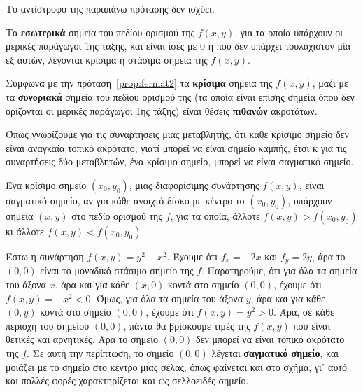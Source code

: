 \begin{rem}
\item {}
  Το αντίστροφο της παραπάνω πρότασης δεν ισχύει. 
\end{rem}

\begin{dfn}
  Τα \textbf{εσωτερικά} σημεία του πεδίου ορισμού της $ f(x,y) $, για τα οποία 
  υπάρχουν οι μερικές παράγωγοι 1ης τάξης, και είναι ίσες με 0 ή που δεν υπάρχει 
  τουλάχιστον μία εξ αυτών, λέγονται \textcolor{Col1}{κρίσιμα} ή
  \textcolor{Col1}{στάσιμα} σημεία της $ f(x,y) $. 
\end{dfn}

\begin{rem}
  Σύμφωνα με την πρόταση~\ref{prop:fermat2} τα \textbf{κρίσιμα} σημεία της $ f(x,y) $, 
  μαζί με τα \textbf{συνοριακά} σημεία του πεδίου ορισμού της (τα οποία είναι επίσης  
  σημεία όπου δεν ορίζονται οι μερικές παράγωγοι 1ης τάξης) είναι θέσεις \textbf{πιθανών} ακροτάτων.
\end{rem}

Όπως γνωρίζουμε για τις συναρτήσεις μιας μεταβλητής, ότι κάθε κρίσιμο σημείο δεν είναι 
αναγκαία τοπικό ακρότατο, γιατί μπορεί να είναι σημείο καμπής, έτσι κ για τις
συναρτήσεις δύο μεταβλητών, ένα κρίσιμο σημείο, μπορεί να είναι σαγματικό σημείο.

\begin{dfn}
  Ένα κρίσιμο σημείο $ (x_{0}, y_{0}) $, μιας διαφορίσιμης συνάρτησης $ f(x,y) $, είναι
  \textcolor{Col1}{σαγματικό σημείο}, αν για κάθε ανοιχτό δίσκο με κέντρο το 
  $ (x_{0}, y_{0}) $, υπάρχουν σημεία $ (x,y) $ στο πεδίο ορισμού της $f$, για τα 
  οποία, άλλοτε $ f(x,y) > f(x_{0}, y_{0}) $ κι άλλοτε $ f(x,y) < f(x_{0}, y_{0}) $. 
\end{dfn}

\begin{example}
\item {}
  Έστω η συνάρτηση $ f(x,y) = y^{2}-x^{2} $. Έχουμε ότι 
  $ f_{x}=-2x $ και $ f_{y}=2y $, άρα το $ (0,0) $ είναι το μοναδικό στάσιμο σημείο 
  της $f$. 
  Παρατηρούμε, ότι για όλα τα σημεία του άξονα $x$, άρα και για κάθε 
  $ (x,0) $ κοντά στο σημείο $(0,0)$, έχουμε ότι $ f(x,y) = -x^{2} < 0 $. 
  Όμως, για όλα τα σημεία του άξονα $ y $, άρα και για κάθε 
  $ (0,y) $ κοντά στο σημείο $ (0,0) $, έχουμε ότι $ f(x,y)=y^{2} > 0 $. 
  Άρα, σε κάθε 
  περιοχή του σημείου $ (0,0) $, πάντα θα βρίσκουμε τιμές της $ f(x,y) $ που είναι
  θετικές και αρνητικές. Άρα το σημείο $ (0,0) $ δεν μπορεί να είναι τοπικό ακρότατο 
  της $f$. Σε αυτή την περίπτωση, το σημείο $ (0,0) $ λέγεται \textbf{σαγματικό
  σημείο}, και μοιάζει με το σημείο στο κέντρο μιας σέλας, 
  όπως φαίνεται και στο σχήμα, γι᾽ αυτό και πολλές φορές χαρακτηρίζεται και ως 
  σελλοειδές σημείο.
\end{example}

